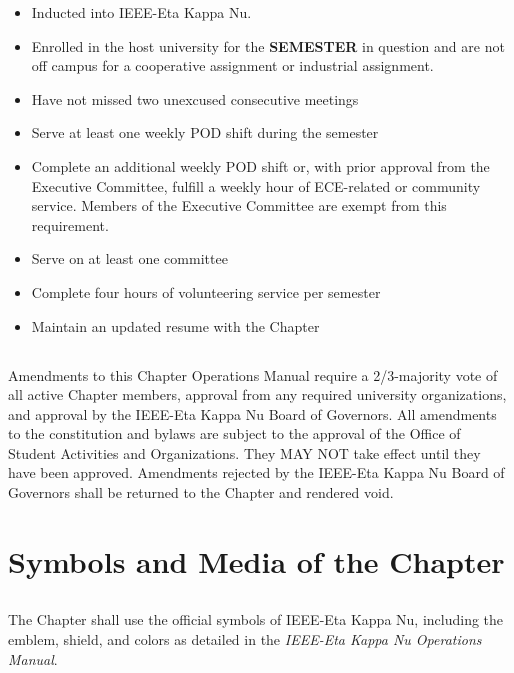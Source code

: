 \documentclass[10pt, oneside]{article}
\begin{document}
\begin{itemize}
    \item Inducted into IEEE-Eta Kappa Nu.
    \item Enrolled in the host university for the \textbf{SEMESTER} in question and are not off campus for a cooperative assignment or industrial assignment.
    \item Have not missed two unexcused consecutive meetings
    \item Serve at least one weekly POD shift during the semester
    \item Complete an additional weekly POD shift or, with prior approval from the Executive Committee, fulfill a weekly hour of ECE-related or community service. Members of the Executive Committee are exempt from this requirement.

    \item Serve on at least one committee
    \item Complete four hours of volunteering service per semester
    \item Maintain an updated resume with the Chapter
\end{itemize}

\subsection{}
Amendments to this Chapter Operations Manual require a 2/3-majority vote of all active Chapter members, approval from any required university organizations, and approval by the IEEE-Eta Kappa Nu Board of Governors. All amendments to the constitution and bylaws are subject to the approval of the Office of Student
Activities and Organizations. They MAY NOT take effect until they have been approved. Amendments rejected by the IEEE-Eta Kappa Nu Board of Governors shall be returned to the Chapter and rendered void.

\section{Symbols and Media of the Chapter}
\subsection{}

The Chapter shall use the official symbols of IEEE-Eta Kappa Nu, including the emblem, shield, and colors as detailed in the \textit{IEEE-Eta Kappa Nu Operations Manual}.

\subsection{}
\end{document}
